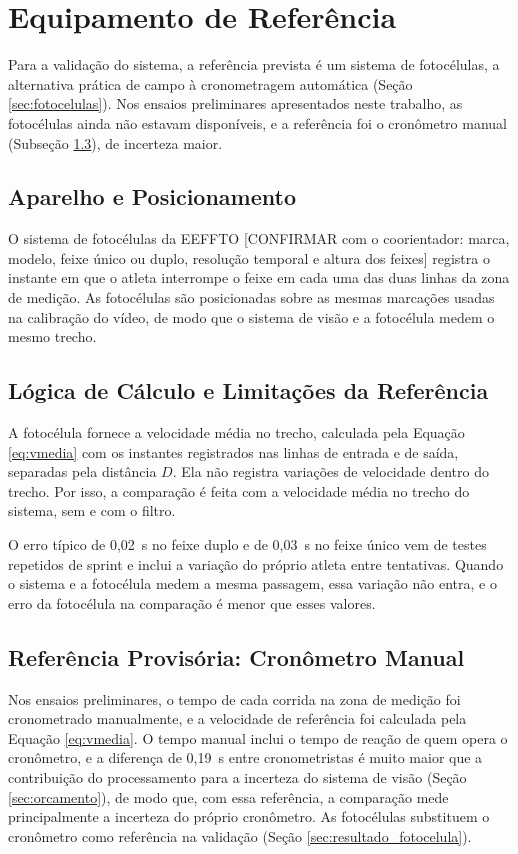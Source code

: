 \documentclass[
    12pt,               %
    openright,          %
    twoside,            %
    a4paper,            %
    chapter=TITLE,      %
    english,            %
    brazil              %
    ]{abntex2}
\begin{document}
\section{Equipamento de Referência}
\label{sec:referencia}

Para a validação do sistema, a referência prevista é um sistema de fotocélulas, a alternativa prática de campo à cronometragem automática (Seção \ref{sec:fotocelulas}). Nos ensaios preliminares apresentados neste trabalho, as fotocélulas ainda não estavam disponíveis, e a referência foi o cronômetro manual (Subseção \ref{sec:cronometro}), de incerteza maior.

\subsection{Aparelho e Posicionamento}
O sistema de fotocélulas da EEFFTO [CONFIRMAR com o coorientador: marca, modelo, feixe único ou duplo, resolução temporal e altura dos feixes] registra o instante em que o atleta interrompe o feixe em cada uma das duas linhas da zona de medição. As fotocélulas são posicionadas sobre as mesmas marcações usadas na calibração do vídeo, de modo que o sistema de visão e a fotocélula medem o mesmo trecho.

\subsection{Lógica de Cálculo e Limitações da Referência}
A fotocélula fornece a velocidade média no trecho, calculada pela Equação \ref{eq:vmedia} com os instantes registrados nas linhas de entrada e de saída, separadas pela distância $D$. Ela não registra variações de velocidade dentro do trecho. Por isso, a comparação é feita com a velocidade média no trecho do sistema, sem e com o filtro.

O erro típico de 0,02~s no feixe duplo e de 0,03~s no feixe único vem de testes repetidos de sprint e inclui a variação do próprio atleta entre tentativas. Quando o sistema e a fotocélula medem a mesma passagem, essa variação não entra, e o erro da fotocélula na comparação é menor que esses valores.

\subsection{Referência Provisória: Cronômetro Manual}
\label{sec:cronometro}
Nos ensaios preliminares, o tempo de cada corrida na zona de medição foi cronometrado manualmente, e a velocidade de referência foi calculada pela Equação \ref{eq:vmedia}. O tempo manual inclui o tempo de reação de quem opera o cronômetro, e a diferença de 0,19~s entre cronometristas é muito maior que a contribuição do processamento para a incerteza do sistema de visão (Seção \ref{sec:orcamento}), de modo que, com essa referência, a comparação mede principalmente a incerteza do próprio cronômetro. As fotocélulas substituem o cronômetro como referência na validação (Seção \ref{sec:resultado_fotocelula}).
\end{document}
